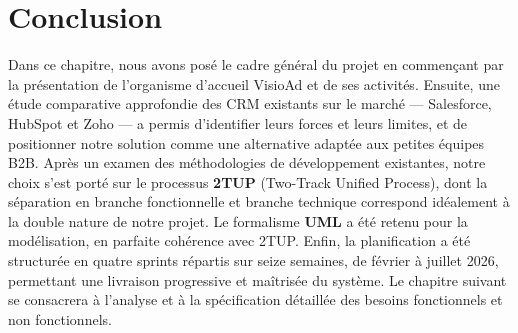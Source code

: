 \section{Conclusion}
Dans ce chapitre, nous avons posé le cadre général du projet en commençant par la présentation de l'organisme d'accueil VisioAd et de ses activités. Ensuite, une étude comparative approfondie des CRM existants sur le marché — Salesforce, HubSpot et Zoho — a permis d'identifier leurs forces et leurs limites, et de positionner notre solution comme une alternative adaptée aux petites équipes B2B. Après un examen des méthodologies de développement existantes, notre choix s'est porté sur le processus \textbf{2TUP} (Two-Track Unified Process), dont la séparation en branche fonctionnelle et branche technique correspond idéalement à la double nature de notre projet. Le formalisme \textbf{UML} a été retenu pour la modélisation, en parfaite cohérence avec 2TUP. Enfin, la planification a été structurée en quatre sprints répartis sur seize semaines, de février à juillet 2026, permettant une livraison progressive et maîtrisée du système. Le chapitre suivant se consacrera à l'analyse et à la spécification détaillée des besoins fonctionnels et non fonctionnels.
